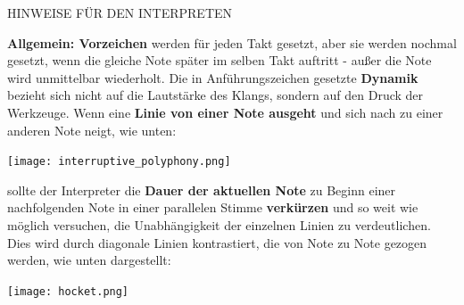 \documentclass[12pt]{article}
\newcommand*\circled[1]{\tikz[baseline=(char.base)]{
            \node[shape=circle,draw,inner sep=1pt] (char) {#1};}}
\begin{document}
\begingroup
\begin{center}
\huge HINWEISE FÜR DEN INTERPRETEN
\end{center}
\endgroup

\begingroup
\textbf{Allgemein: \circled{1} Vorzeichen} werden für jeden Takt gesetzt, aber sie werden nochmal gesetzt, wenn die gleiche Note später im selben Takt auftritt - außer die Note wird unmittelbar wiederholt. \textbf{\circled{2}} Die in Anführungszeichen gesetzte \textbf{Dynamik} bezieht sich nicht auf die Lautstärke des Klangs, sondern auf den Druck der Werkzeuge. \textbf{\circled{3}} Wenn eine \textbf{Linie von einer Note ausgeht} und sich nach zu einer anderen Note neigt, wie unten: 

\begin{center}
\texttt{[image: interruptive\_polyphony.png]}
\end{center}

sollte der Interpreter die \textbf{Dauer der aktuellen Note} zu Beginn einer nachfolgenden Note in einer parallelen Stimme \textbf{verkürzen} und so weit wie möglich versuchen, die Unabhängigkeit der einzelnen Linien zu verdeutlichen. Dies wird durch diagonale Linien kontrastiert, die von Note zu Note gezogen werden, wie unten dargestellt: 

\begin{center}
\texttt{[image: hocket.png]}
\end{center}
\end{document}
